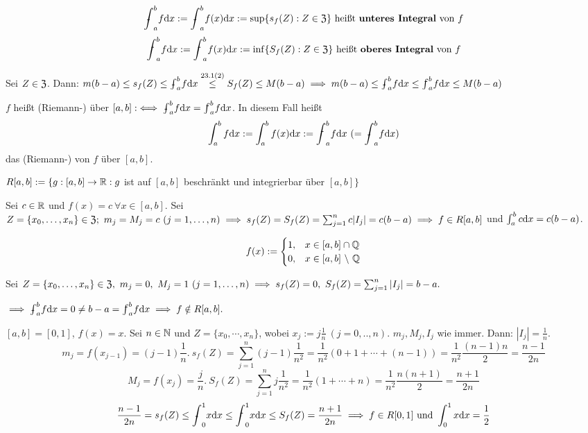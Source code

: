 \documentclass[a4paper,oneside,DIV15,BCOR12mm]{scrbook}
\begin{document}
\newcommand{\intab}[1]{\ensuremath{\int_a^b{#1\dx}}}
\newcommand{\uintab}[1]{\ensuremath{\uint_a^b{#1\dx}}}
\newcommand{\ointab}[1]{\ensuremath{\oint_a^b{#1\dx}}}

\begin{definition}
$$\uintab{f} := \uintab{f(x)} := \sup\{s_f(Z): Z \in \Z\}\text{ heißt \begriff{unteres Integral} von }f$$
$$\ointab{f} := \ointab{f(x)} := \inf\{S_f(Z): Z \in \Z\}\text{ heißt \begriff{oberes Integral} von }f$$
\end{definition}

Sei $Z \in \mathfrak{Z}$. Dann: $m(b-a) \le s_f(Z) \le \uintab{f} \overset{\text{23.1(2)}}{\le} S_f(Z) \le M(b-a) \folgt m(b-a) \le \uintab{f} \le \ointab{f} \le M(b-a)$

\begin{definition}
$f$ heißt (Riemann-) über $[a,b] :\equizu \uintab{f} = \ointab{f}$. In diesem Fall heißt
$$\intab{f} := \intab{f(x)} := \ointab{f}\ (=\uintab{f})$$
das (Riemann-) von $f$ über $[a,b]$.

$R[a,b] := \{g: [a,b] \to \mathbb{R}: g$ ist auf $[a,b]$ beschränkt und integrierbar über $[a,b]\}$
\end{definition}

\begin{beispiele}
\item Sei $c \in \mathbb{R}$ und $f(x) = c\ \forall x \in [a,b]$. Sei $Z = \{x_0,\ldots,x_n\} \in \mathfrak{Z};\ m_j = M_j = c\ (j = 1,\ldots,n) \implies s_f(Z) = S_f(Z) = \sum_{j=1}^{n}{c|I_j|} = c(b-a) \implies f \in R[a,b]$ und $\intab{c} = c(b-a)$.
\item $$f(x) := \begin{cases}
1,& x \in [a,b] \cap \mathbb{Q}\\
0,& x \in [a,b]\ \backslash\ \mathbb{Q} \end{cases}$$

Sei $Z = \{x_0,\ldots,x_n\} \in \mathfrak{Z},\ m_j = 0,\ M_j = 1\ (j=1,\ldots,n)\\
\implies s_f(Z) = 0,\ S_f(Z) = \sum_{j=1}^{n}{|I_j|} = b-a.$

$\folgt \uintab{f} = 0 \ne b-a = \ointab{f} \folgt f \notin R[a,b].$

\item $[a,b]=[0,1]$, $f(x)=x$. Sei $n \in\mathbb{N}$ und $Z=\{x_0, \cdots, x_n\}$, wobei $x_j:=j\frac{1}{n}\ (j=0,..,n).$  $m_j, M_j, I_j$ wie immer. Dann: $|I_j|=\frac{1}{n}$.
$$m_j=f(x_{j-1})=(j-1)\frac{1}{n}.\ s_f(Z)=\sum_{j=1}^{n}(j-1)\frac{1}{n^2}=\frac{1}{n^2}(0+1+\cdots+(n-1))=\frac{1}{n^2}\frac{(n-1)n}{2}=\frac{n-1}{2n}$$
$$M_j=f(x_j)=\frac{j}{n}.\ S_f(Z)=\sum^{n}_{j=1}j\frac{1}{n^2}=\frac{1}{n^2}(1+\cdots+n)=\frac{1}{n^2}\frac{n(n+1)}{2}=\frac{n+1}{2n}$$
$$\frac{n-1}{2n}=s_f(Z)\le\uint^1_0x\dx\le\oint^1_0x\dx\le S_f(Z)=\frac{n+1}{2n} \folgt f\in R[0,1] \text{ und } \int_0^1x\dx=\frac{1}{2}$$
\end{beispiele}
\end{document}
